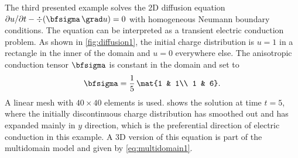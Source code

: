 The third presented example solves the 2D diffusion equation $\partial u/\partial t - \div(\bfsigma\,\grad u) = 0$ with homogeneous Neumann boundary conditions. The equation can be interpreted as a transient electric conduction problem. As shown in \cref{fig:diffusion1}, the initial charge distribution is $u=1$ in a rectangle in the inner of the domain and $u=0$ everywhere else. The anisotropic conduction tensor $\bfsigma$ is constant in the domain and set to %
\begin{align*}
  \bfsigma = \frac15\,\mat{1 & 1\\
              1 & 6}.
\end{align*}
A linear mesh with $40\times 40$ elements is used.  shows the solution at time $t=5$, where the initially discontinuous charge distribution has smoothed out and has expanded mainly in $y$ direction, which is the preferential direction of electric conduction in this example. A 3D version of this equation is part of the multidomain model and given by \cref{eq:multidomain1}.

